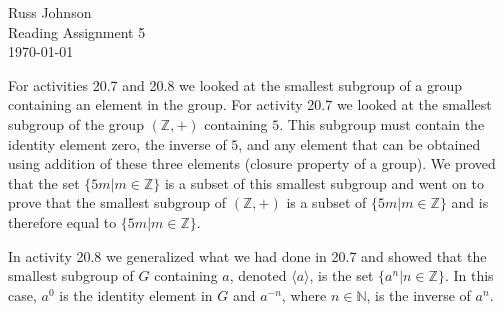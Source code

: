 \documentclass[11pt,a4paper]{article}
\begin{document}
\begin{flushright}
Russ Johnson\\
Reading Assignment 5\\
\today\\
\end{flushright}
For activities 20.7 and 20.8 we looked at the smallest subgroup of a group containing an element in the group. For activity 20.7 we looked at the smallest subgroup of the group $(\mathbb{Z},+)$ containing $5$. This subgroup must contain the identity element zero, the inverse of $5$, and any element that can be obtained using addition of these three elements (closure property of a group). We proved that the set $\{5m|m\in\mathbb{Z}\}$ is a subset of this smallest subgroup and went on to prove that the smallest subgroup of $(\mathbb{Z},+)$ is a subset of $\{5m|m\in\mathbb{Z}\}$ and is therefore equal to $\{5m|m\in\mathbb{Z}\}$.

In activity 20.8 we generalized what we had done in 20.7 and showed that the smallest subgroup of $G$ containing $a$, denoted $\langle a\rangle$, is the set $\{a^n|n\in\mathbb{Z}\}$. In this case, $a^0$ is the identity element in $G$ and $a^{-n}$, where $n\in\mathbb{N}$, is the inverse of $a^n$. 
\end{document}
